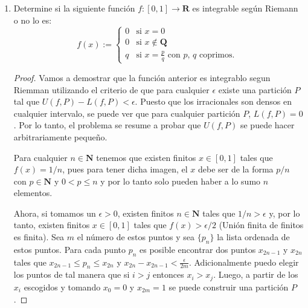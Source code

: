 \documentclass[letter,twoside,12pt]{article}
\begin{document}
\begin{enumerate}
\begin{proof}
\begin{itemize}
\end{itemize}

Luego, podemos construir una sucesión tal que el elemento par $x_{2n}$ sea uno de los infinitos puntos en la bola $U_n$ descritos anteriormente y $x_{2n+1} $ sea el elemento correspondiente tal que $d(x_{2n},x_{2n+1})<1/2^n$ y $d(f(x_{2n}),f(x_{2n+1}))>\epsilon $.

Ahora, por convergencia de la serie $\Sigma 1/2^n$, la sucesión anterior es una sucesión de Cauchy que converge usando nuestro supuesto que $X$ es completo. Si tomamos la sucesión $f(x_n)$ formada por las imagenes de la secuencia, sabemos por continuidad de $f$ que esta sucesión también debe converger en $ Y $ y por lo tanto debe ser de Cauchy. Sin embargo, por construcción $f(x_n) $ no es de Cauchy, puesto que para cualquier $ N $ tenemos que $d(f(x_{2N}),f(x_{2N+1}))>\epsilon $.
Por lo tanto, llegamos a una contradicción. 
\end{proof}

\item Determine si la siguiente función $f : [0,1] \rightarrow \mathbf{R}$ es integrable según Riemann o no lo es: 
$$f(x) := \left\{
	\begin{array}{lll}
		0 & \mbox{si } x = 0 \\
		0 & \mbox{si } x \not\in \mathbf{Q} \\
		q & \mbox{si } x = \frac{p}{q} \mbox{ con } p\mbox{, } q \mbox{ coprimos. }
	\end{array}
\right.$$

\begin{proof}

Vamos a demostrar que la función anterior es integrablo segun Riemman utilizando el criterio de que para cualquier $\epsilon $ existe una partición $P$ tal que $U(f,P)-L(f,P) < \epsilon $. Puesto que los irracionales son densos en cualquier intervalo, se puede ver que para cualquier partición $P$, $L(f,P) = 0$. Por lo tanto, el problema se resume a probar que $U(f,P) $ se puede hacer arbitrariamente pequeño.

Para cualquier $n \in \mathbf{N}$ tenemos que existen finitos $ x \in [0,1] $ tales que $ f(x) = 1/n $, pues para tener dicha imagen, el $ x $ debe ser de la forma $p/n$ con $p \in \mathbf{N} $ y $0 < p \leq n $ y por lo tanto solo pueden haber a lo sumo $ n $ elementos.

Ahora, si tomamos un $\epsilon > 0 $, existen finitos $n \in \mathbf{N} $ tales que $1/n > \epsilon $ y, por lo tanto, existen finitos $ x \in [0,1]$ tales que $f(x)> \epsilon/ 2$ (Unión finita de finitos es finita). Sea $m$ el número de estos puntos y sea $\{p_n\}$ la lista ordenada de estos puntos. Para cada punto $p_n $ es posible encontrar dos puntos $x_{2n-1}$ y $x_{2n}$ tales que $x_{2n-1}\leq p_n \leq x_{2n} $ y $x_{2n}-x_{2n-1} < \frac{\epsilon}{2m}$. Adicionalmente puedo elegir los puntos de tal manera que si $i > j $ entonces $x_i > x_j $. Luego, a partir de los $x_i$ escogidos y tomando $x_0 = 0$ y $x_{2m} = 1 $ se puede construir una partición $ P $.


\end{proof}
\end{enumerate}
\end{document}
